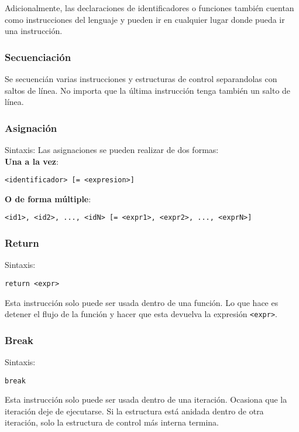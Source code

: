 \documentclass[12pt, spanish]{report}
\begin{document}
Adicionalmente, las declaraciones de identificadores o funciones
tambi\'en cuentan como instrucciones del lenguaje y pueden ir en cualquier
lugar donde pueda ir una instrucci\'on.

\subsubsection{Secuenciaci\'on}
Se secuenci\'an varias instrucciones y estructuras de control separandolas con saltos
de l\'inea. No importa que la \'ultima instrucci\'on tenga
tambi\'en un salto de l\'inea.

\subsubsection{Asignaci\'on}
Sintaxis:
Las asignaciones se pueden realizar de dos formas:\\

\textbf{Una a la vez}:
\begin{verbatim}
<identificador> [= <expresion>]
\end{verbatim}

\textbf{O de forma m\'ultiple}:
\begin{verbatim}
<id1>, <id2>, ..., <idN> [= <expr1>, <expr2>, ..., <exprN>]
\end{verbatim}

\subsubsection{Return}
\label{sec:return}
Sintaxis:
\begin{verbatim}
return <expr>
\end{verbatim}

Esta instrucci\'on solo puede ser usada dentro de una funci\'on. Lo
que hace es detener el flujo de la funci\'on y hacer que esta devuelva
la expresi\'on \texttt{<expr>}.

\subsubsection{Break}
\label{sec:return}
Sintaxis:
\begin{verbatim}
break
\end{verbatim}

Esta instrucci\'on solo puede ser usada dentro de una
iteraci\'on. Ocasiona que la iteraci\'on deje de ejecutarse.
Si la estructura est\'a anidada dentro de otra iteraci\'on, 
solo la estructura de control m\'as interna termina.
\end{document}
